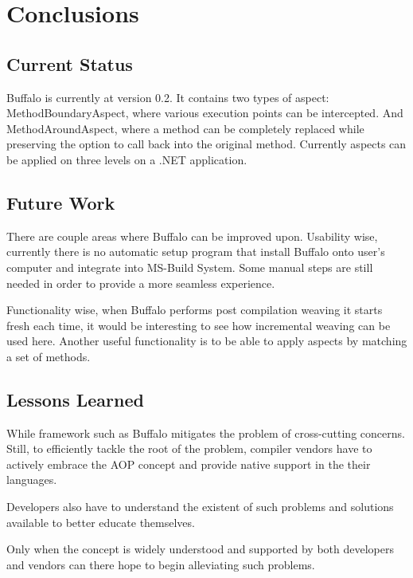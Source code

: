 \chapter{Conclusions}
\section{Current Status}

Buffalo is currently at version 0.2. It contains two types of aspect: MethodBoundaryAspect, where various execution points can be intercepted. And MethodAroundAspect, where a method can be completely replaced while preserving the option to call back into the original method. Currently aspects can be applied on three levels on a .NET application.

\section{Future Work}

There are couple areas where Buffalo can be improved upon. Usability wise, currently there is no automatic setup program that install Buffalo onto user’s computer and integrate into MS-Build System. Some manual steps are still needed in order to provide a more seamless experience.

Functionality wise, when Buffalo performs post compilation weaving it starts fresh each time, it would be interesting to see how incremental weaving can be used here. Another useful functionality is to be able to apply aspects by matching a set of methods.

\section{Lessons Learned}

While framework such as Buffalo mitigates the problem of cross-cutting concerns. Still, to efficiently tackle the root of the problem, compiler vendors have to actively embrace the AOP concept and provide native support in the their languages. 

Developers also have to understand the existent of such problems and solutions available to better educate themselves.

Only when the concept is widely understood and supported by both developers and vendors can there hope to begin alleviating such problems.
